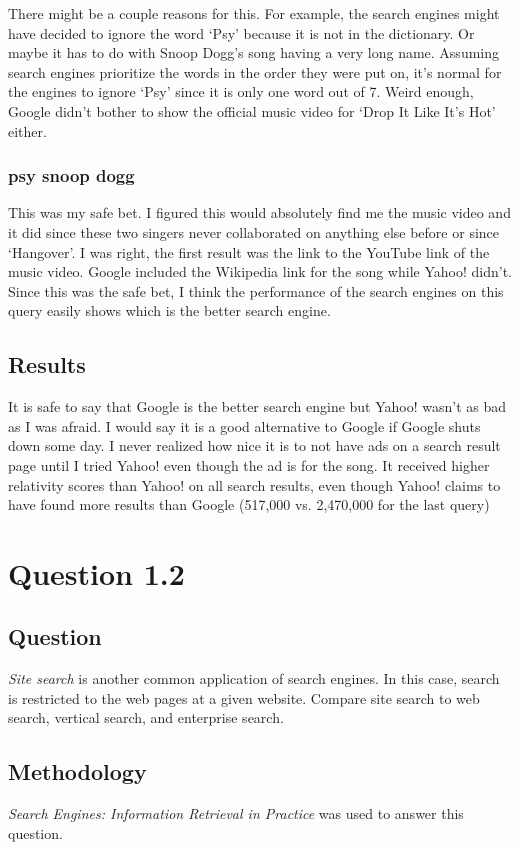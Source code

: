 \documentclass[10pt,letterpaper,bibliography=totoc]{scrartcl}
\begin{document}
There might be a couple reasons for this. For example, the search engines might have decided to ignore the word `Psy' because it is not in the dictionary. Or maybe it has to do with Snoop Dogg's song having a very long name. Assuming search engines prioritize the words in the order they were put on, it's normal for the engines to ignore `Psy' since it is only one word out of 7. Weird enough, Google didn't bother to show the official music video for `Drop It Like It's Hot' either.

\subsubsection{psy snoop dogg}
This was my safe bet. I figured this would absolutely find me the music video and it did since these two singers never collaborated on anything else before or since `Hangover'. I was right, the first result was the link to the YouTube link of the music video. Google included the Wikipedia link for the song while Yahoo! didn't. Since this was the safe bet, I think the performance of the search engines on this query easily shows which is the better search engine.

\subsection{Results}
It is safe to say that Google is the better search engine but Yahoo! wasn't as bad as I was afraid. I would say it is a good alternative to Google if Google shuts down some day. I never realized how nice it is to not have ads on a search result page until I tried Yahoo! even though the ad is for the song. It received higher relativity scores than Yahoo! on all search results, even though Yahoo! claims to have found more results than Google (517,000 vs. 2,470,000 for the last query)


\section{Question 1.2}
\subsection{Question}
\textit{Site search} is another common application of search engines. In this case, search is restricted to the web pages at a given website. Compare site search to web search, vertical search, and enterprise search.

\subsection{Methodology}
\textit{Search Engines: Information Retrieval in Practice}\cite{classtext} was used to answer this question.
\end{document}
